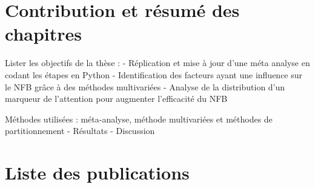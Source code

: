 \section{Contribution et résumé des chapitres}
Lister les objectifs de la thèse :
- Réplication et mise à jour d’une méta analyse en codant les étapes en Python
- Identification des facteurs ayant une influence sur le NFB grâce à des méthodes multivariées
- Analyse de la distribution d’un marqueur de l’attention pour augmenter l’efficacité du NFB

Méthodes utilisées : méta-analyse, méthode multivariées et méthodes de partitionnement
- Résultats
- Discussion

\section{Liste des publications}
